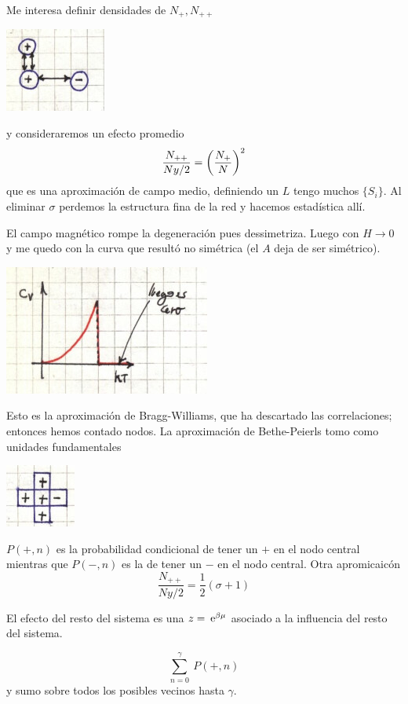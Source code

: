 \documentclass[10pt,oneside]{CBFT_book}
\begin{document}
Me interesa definir densidades de $ N_+, N_{++} $

\includegraphics[scale=0.4]{images/1606337009.jpg}

y consideraremos un efecto promedio
\[
	\frac{ N_{++} }{ N y/2 } = \left( \frac{  N_{+}  }{  N  } \right)^2
\]
que es una aproximación de campo medio, definiendo un $L$ tengo muchos $\{ S_i \}$.
Al eliminar $\sigma$ perdemos la estructura fina de la red y hacemos estadística allí.

El campo magnético rompe la degeneración pues dessimetriza. Luego con $ H \to 0 $ y me quedo
con la curva que resultó no simétrica (el $A$ deja de ser simétrico).

\includegraphics[scale=0.4]{images/1606337012.jpg}

Esto es la aproximación de Bragg-Williams, que ha descartado las correlaciones; entonces
hemos contado nodos.
La aproximación de Bethe-Peierls tomo como unidades fundamentales

\includegraphics[scale=0.4]{images/1606337015.jpg}

$P(+,n)$ es la probabilidad condicional de tener un $+$ en el nodo central mientras que
$P(-,n)$ es la de tener un $-$ en el nodo central.
Otra apromicaicón
\[
	\frac{ N_{++} }{ N y/2 } = \frac{1}{2}( \sigma + 1 )
\]

El efecto del resto del sistema es una $ z = \:\mathrm{e}^{\beta \mu} $ asociado a la influencia
del resto del sistema.

\[
	\sum_{n=0}^\gamma \: P(+,n)
\]
y sumo sobre todos los posibles vecinos hasta $\gamma$.
\end{document}

